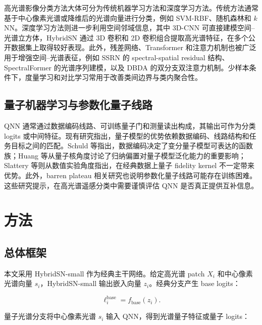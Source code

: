 \documentclass[UTF8,a4paper,zihao=-4,fontset=fandol]{ctexart}
\begin{document}
高光谱影像分类方法大体可分为传统机器学习方法和深度学习方法。传统方法通常基于中心像素光谱或降维后的光谱向量进行分类，例如 SVM-RBF、随机森林和 $k$NN\cite{camps2005svm}。深度学习方法则进一步利用空间邻域信息，其中 3D-CNN 可直接建模空间--光谱立方体\cite{chen2016deep}，HybridSN 通过 3D 卷积和 2D 卷积组合提取高光谱特征，在多个公开数据集上取得较好表现\cite{roy2020hybridsn}。此外，残差网络、Transformer 和注意力机制也被广泛用于增强空间--光谱表征，例如 SSRN 的 spectral-spatial residual 结构\cite{zhong2018ssrn}、SpectralFormer 的光谱序列建模\cite{hong2022spectralformer}，以及 DBDA 的双分支双注意力机制\cite{li2020dbda}。少样本条件下，度量学习和对比学习常用于改善类间边界与类内聚合性\cite{snell2017proto,khosla2020supcon}。

\subsection{量子机器学习与参数化量子线路}

QNN 通常通过数据编码线路、可训练量子门和测量读出构成，其输出可作为分类 logits 或中间特征。现有研究指出，量子模型的优势依赖数据编码、线路结构和任务目标之间的匹配。Schuld 等指出，数据编码决定了变分量子模型可表达的函数族\cite{schuld2021encoding}；Huang 等从量子核角度讨论了归纳偏置对量子模型泛化能力的重要影响\cite{huang2021inductive}；Slattery 等则从数值实验角度指出，在经典数据上量子 fidelity kernel 不一定带来优势\cite{slattery2023numerical}。此外，barren plateau 相关研究也说明参数化量子线路可能存在训练困难\cite{mcclean2018barren,cerezo2021barren}。这些研究提示，在高光谱遥感分类中需要谨慎评估 QNN 是否真正提供互补信息。

\section{方法}

\subsection{总体框架}

本文采用 HybridSN-small 作为经典主干网络。给定高光谱 patch $X_i$ 和中心像素光谱向量 $s_i$，HybridSN-small 输出嵌入向量 $z_i$。经典分支产生 base logits：

\begin{equation}
  \ell^{\mathrm{base}}_i = f_{\mathrm{base}}(z_i).
\end{equation}

量子光谱分支将中心像素光谱 $s_i$ 输入 QNN，得到光谱量子特征或量子 logits：
\end{document}
